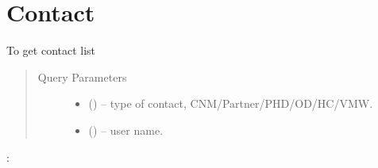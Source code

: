 \documentclass[letterpaper,10pt,english,openany,oneside]{sphinxmanual}
\begin{document}
\section{Contact}
\label{\detokenize{api-cmi/v1:contact}}

\begin{fulllineitems}
\label{\detokenize{api-cmi/v1:post--api-malaria-info-v1-Contact-list}}
\sphinxAtStartPar
To get contact list
\begin{quote}\begin{description}
\item[{Query Parameters}] \leavevmode\begin{itemize}
\item {} 
\sphinxAtStartPar
{} () – type of contact, CNM/Partner/PHD/OD/HC/VMW.

\item {} 
\sphinxAtStartPar
{} () – user name.

\end{itemize}

\end{description}\end{quote}

\sphinxAtStartPar
{}:


\end{fulllineitems}
\end{document}
